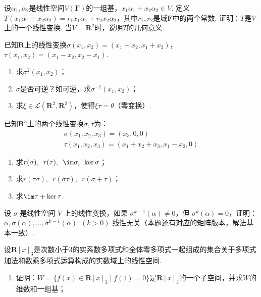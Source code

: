 \begin{exercise}
\begin{exgroup}
        \item 设$\alpha_1,\alpha_2$是线性空间$V(\mathbf{F})$的一组基，$x_1\alpha_1+x_2\alpha_2 \in V$. 定义$T(x_1\alpha_1+x_2\alpha_2)=r_1x_1\alpha_1+r_2x_2\alpha_2$，其中$r_1,r_2$是域$\mathbf{F}$中的两个常数. 证明：$T$是$V$上的一个线性变换. 当$V=\mathbf{R}^2$时，说明$T$的几何意义.

        \item 已知$\mathbf{R}$上的线性变换$\sigma(x_1,x_2)=(x_1-x_2,x_1+x_2)$，$\tau(x_1,x_2)=(x_1-x_2,x_2-x_1)$.
        \begin{enumerate}
            \item 求$\sigma^2(x_1,x_2)$；

            \item $\sigma$是否可逆？如可逆，求$\sigma^{-1}(x_1,x_2)$；

            \item 求$\xi\in \mathcal{L}(\mathbf{R}^2,\mathbf{R}^2)$，使得$\xi\tau=\theta$（零变换）.
        \end{enumerate}

        \item 已知$\mathbf{R}^3$上的两个线性变换$\sigma,\tau$为：
        \begin{gather*}
            \sigma(x_1,x_2,x_3)=(x_3,0,0) \\
            \tau(x_1,x_2,x_3)=(x_1+x_2+x_3,x_1-x_2,0)
        \end{gather*}
        \begin{enumerate}
            \item 求$r(\sigma),\enspace r(\tau),\enspace \im\sigma,\enspace \ker\sigma$；

            \item 求$r(\tau\sigma),\enspace r(\sigma\tau),\enspace r(\sigma+\tau)$；

            \item 求$\im\tau+\ker\tau$.
        \end{enumerate}

        \item 设 $\sigma$ 是线性空间 $V$ 上的线性变换，如果 $\sigma^{k-1}(\alpha) \neq 0$，但 $\sigma^{k}(\alpha) = 0$，证明：\\
        $\alpha,\sigma(\alpha),\ldots,\sigma^{k-1}(\alpha)\enspace(k>0)$ 线性无关（本题还有对应的矩阵版本，解法基本一致）.

        \item 设$\mathbf{R}[x]_3$是次数小于3的实系数多项式和全体零多项式一起组成的集合关于多项式加法和数乘多项式运算构成的实数域上的线性空间.
        \begin{enumerate}
            \item 证明：$W=\{f(x)\in \mathbf{R}[x]_3 \mid f(1)=0\}$是$\mathbf{R}[x]_3$的一个子空间，并求$W$的维数和一组基；


\end{enumerate}
\end{exgroup}
\end{exercise}
